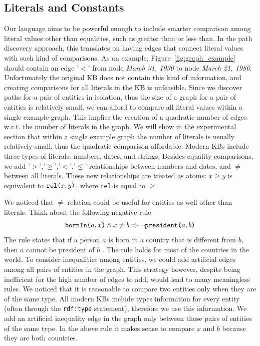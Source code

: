 \subsection{Literals and Constants}
Our language aims to be powerful enough to include smarter comparison among literal values other than equalities, such as greater than or less than. In the path discovery approach, this translates on having edges that connect literal values with such kind of comparisons. As an example, Figure~\ref{fig:graph_example} should contain an edge '$<$' from node \textit{March 31, 1930} to node \textit{March 21, 1986}. Unfortunately the original KB does not contain this kind of information, and creating comparisons for all literals in the KB is unfeasible. Since we discover paths for a pair of entities in isolation, thus the size of a graph for a pair of entities is relatively small, we can afford to compare all literal values within a single example graph. This implies the creation of a quadratic number of edges w.r.t. the number of literals in the graph. We will show in the experimental section that within a single example graph the number of literals is usually relatively small, thus the quadratic comparison affordable. Modern KBs include three types of literals: numbers, dates, and strings. Besides equality comparisons, we add '$>$','$\geq$','$<$','$\leq$' relationships between numbers and dates, and $\neq$ between all literals. These new relationships are treated as atoms: $x \geq y$ is equivalent to $\texttt{rel(}x,y\texttt{)}$, where \texttt{rel} is equal to $\geq$.

We noticed that $\neq$ relation could be useful for entities as well other than literals. Think about the following negative rule:
$$ \texttt{bornIn(}a,x\texttt{)} \wedge x \neq b \Rightarrow \neg \texttt{president(}a,b\texttt{)} $$
The rule states that if a person $a$ is born in a country that is different from $b$, then $a$ cannot be president of $b$ . The rule holds for most of the countries in the world. To consider inequalities among entities, we could add artificial edges among all pairs of entities in the graph. This strategy however, despite being inefficient for the high number of edges to add, would lead to many meaningless rules. We noticed that it is reasonable to compare two entities only when they are of the same type. All modern KBs include types information for every entity (often through the \texttt{rdf:type} statement), therefore we use this information. We add an artificial inequality edge in the graph only between those pairs of entities of the same type. In the above rule it makes sense to compare $x$ and $b$ because they are both countries.

